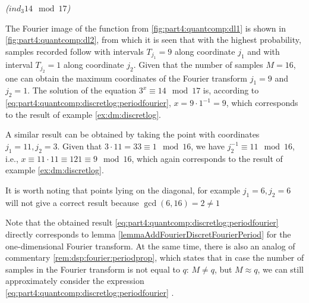 \begin{example}
\emph{($ind_3{14} \mod{17}$)}
%



The Fourier image of the function from \autoref{fig:part4:quantcomp:dl1} is shown in
\autoref{fig:part4:quantcomp:dl2}, from which it is seen that with the highest
probability, samples recorded follow with intervals $T_{j_1} = 9$ along coordinate $j_1$ and with interval $T_{j_2} =
1$ along coordinate $j_2$. Given that the number of samples $M=16$, one can obtain
the maximum coordinates of the Fourier transform $j_1 = 9$
and $j_2 = 1$. The solution of the equation $3^x \equiv 14 \mod 17$
is, according to
\eqref{eq:part4:quantcomp:discretlog:periodfourier}, $x = 9 \cdot 1^{-1}
= 9$, which corresponds to the result of example 
\ref{ex:dm:discretlog}.

A similar result can be obtained by taking the point with coordinates 
$j_1 = 11, j_2 = 3$. Given that $3 \cdot 11 = 33 \equiv 1 \mod 16$,
we have
$j_2^{-1} \equiv 11 \mod 16$, i.e., $x \equiv 11 \cdot 11 \equiv 121
\equiv 9 \mod 16$, which again corresponds to the result of example 
\ref{ex:dm:discretlog}.

It is worth noting that points lying on the diagonal, for example $j_1 = 6, j_2
= 6$ will not give a correct result because $\gcd(6,
16) = 2 \ne 1$

\label{ex:part4:quantcomp:discretlog:periodfinding}
\end{example}

Note that the obtained result
\eqref{eq:part4:quantcomp:discretlog:periodfourier} directly
corresponds to lemma \ref{lemmaAddFourierDiscretFourierPeriod} for
the one-dimensional Fourier transform. At the same time, there is also an analog of
commentary \ref{rem:dsp:fourier:periodprop}, which states that in
case the number of samples in the Fourier transform is not equal to $q$: $M \ne
q$, but $M \approx q$, we can still approximately consider the expression 
\eqref{eq:part4:quantcomp:discretlog:periodfourier}
\cite{Proos:2003:SDL:2011528.2011531}.  


